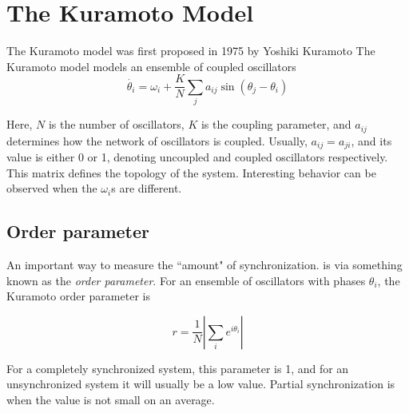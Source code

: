 \documentclass[12pt]{article}
\begin{document}
\section{The Kuramoto Model}
The Kuramoto model was first proposed in 1975 by Yoshiki Kuramoto\cite{kuramoto1975proceedings}
The Kuramoto model models an ensemble of coupled oscillators
$$\dot{\theta_i} = \omega_i + \frac{K}{N}\sum_j a_{ij}\sin(\theta_j - \theta_i) $$

Here, $N$ is the number of oscillators, $K$ is the coupling parameter, and $a_{ij}$ determines how the network of oscillators is coupled. Usually, $a_{ij}=a_{ji}$, and its value is either 0 or 1, denoting uncoupled and coupled oscillators respectively. This matrix defines the topology of the system. Interesting behavior can be observed when the $\omega_i$s are different.

\subsection{Order parameter}
An important way to measure the ``amount" of synchronization. is via something known as the \emph{order parameter}. For an ensemble of oscillators with phases $\theta_i$, the Kuramoto order parameter is 

$$r = \frac1{N}\left|\sum_i e^{i\theta_i}\right|$$

For a completely synchronized system, this parameter is 1, and for an unsynchronized system it will usually be a low value. Partial synchronization is when the value is not small on an average.
\end{document}
